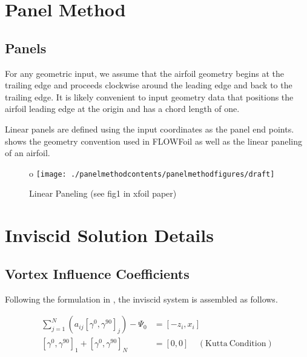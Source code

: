 \clearpage
\newpage


\section{Panel Method}
\label{sec:panelmethod}

\subsection{Panels}
\label{ssec:panels}

For any geometric input, we assume that the airfoil geometry begins at the trailing edge and proceeds clockwise around the leading edge and back to the trailing edge.
It is likely convenient to input geometry data that positions the airfoil leading edge at the origin and has a chord length of one.

Linear panels are defined using the input coordinates as the panel end points.
 shows the geometry convention used in FLOWFoil as well as the linear paneling of an airfoil.

\begin{figure}[h]
	\centering
o	\texttt{[image: ./panelmethodcontents/panelmethodfigures/draft]}
	\caption{Linear Paneling (see fig1 in xfoil paper)}
	\label{fig:linearpanels}
\end{figure}


\section{Inviscid Solution Details}
\label{sec:inviscidsolution}


\subsection{Vortex Influence Coefficients}
\label{ssec:vortexinfluencecoefficients}

Following the formulation in \cite{fidkowski_coupled_2022}, the inviscid system is assembled as follows.

\begin{equation}
	\begin{aligned}
		\sum_{j=1}^N(a_{ij}[\gamma^0, \gamma^{90}]_j) - \Psi_0 &= [-z_i, x_i] \\
		[\gamma^0, \gamma^{90}]_1 + [\gamma^0, \gamma^{90}]_N &= [0, 0] ~~~~~\mathrm{(Kutta~Condition)}
	\end{aligned}
\end{equation}

